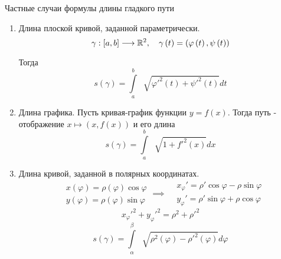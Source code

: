 \documentclass[../main.tex]{subfiles}
\begin{document}
\begin{prop}{Частные случаи формулы длины гладкого пути}
    \begin{enumerate}
        \item Длина плоской кривой, заданной параметрически. 
        \[ \gamma : \left[ a,b\right] \longrightarrow \mathbb{R} ^2,\quad \gamma\left( t\right)=\left( \varphi \left( t\right), \psi\left( t\right)\right)\]
        \par Тогда
        \[ \boxed{s\left( \gamma \right)= \displaystyle\int\limits_{ a}^{ b} \;\sqrt[]{ \varphi '^2\left( t\right)+\psi'^2\left( t\right)}dt}\] 
        \item Длина графика. Пусть кривая-график функции \( y = f\left( x\right)\). Тогда путь - отображение \( x \longmapsto \left( x, f\left( x\right)\right)\) и его длина 
        \[ \boxed{s\left( \gamma \right)= \displaystyle\int\limits_{ a}^{ b} \;\sqrt[]{1+f'^2\left( x\right)}dx}\]
        \item Длина кривой, заданной в полярных координатах. 
        \begin{equation*}
            \begin{aligned}
                &x\left( \varphi \right)= \rho\left( \varphi \right) \cos \varphi \\ 
                &y\left( \varphi \right)= \rho\left( \varphi \right) \sin \varphi 
            \end{aligned}
            \implies 
            \begin{aligned}
                &x_ \varphi '= \rho' \cos \varphi - \rho \sin \varphi \\ 
                &y_ \varphi '= \rho' \sin \varphi + \rho \cos \varphi 
            \end{aligned}
        \end{equation*}
        \[ x_ \varphi '^2+ y_ \varphi '^2= \rho^2+ \rho'^2\]
        \[ \boxed{s\left( \gamma \right)= \displaystyle\int\limits_{ \alpha }^{ \beta } \;\sqrt[]{ \rho^2\left( \varphi \right)- \rho'^2\left( \varphi \right)}d \varphi }\]
    \end{enumerate}
\end{prop}
\end{document}
